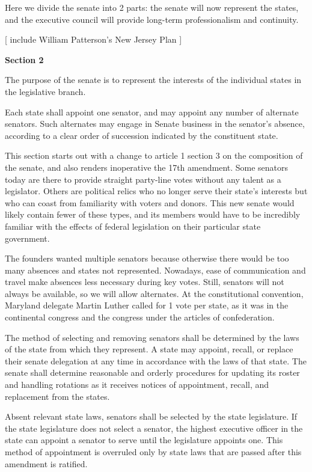 \documentclass{article}
\begin{document}
Here we divide the senate into 2 parts: the senate will now represent the states, and the executive council will provide long-term professionalism and continuity.

[ include William Patterson's New Jersey Plan ]

\begin{quoting}
\textbf{Section 2}

The purpose of the senate is to represent the interests of the individual states in the legislative branch.

Each state shall appoint one senator, and may appoint any number of alternate senators. Such alternates may engage in Senate business in the senator’s absence, according to a clear order of succession indicated by the constituent state.
\end{quoting}

This section starts out with a change to article 1 section 3 on the composition of the senate, and also renders inoperative the 17th amendment. Some senators today are there to provide straight party-line votes without any talent as a legislator. Others are political relics who no longer serve their state’s interests but who can coast from familiarity with voters and donors. This new senate would likely contain fewer of these types, and its members would have to be incredibly familiar with the effects of federal legislation on their particular state government.


The founders wanted multiple senators because otherwise there would be too many absences and states not represented. Nowadays, ease of communication and travel make absences less necessary during key votes. Still, senators will not always be available, so we will allow alternates. At the constitutional convention, Maryland delegate Martin Luther called for 1 vote per state, as it was in the continental congress and the congress under the articles of confederation.

\begin{quoting}
The method of selecting and removing senators shall be determined by the laws of the state from which they represent. A state may appoint, recall, or replace their senate delegation at any time in accordance with the laws of that state. The senate shall determine reasonable and orderly procedures for updating its roster and handling rotations as it receives notices of appointment, recall, and replacement from the states.

Absent relevant state laws, senators shall be selected by the state legislature. If the state legislature does not select a senator, the highest executive officer in the state can appoint a senator to serve until the legislature appoints one. This method of appointment is overruled only by state laws that are passed after this amendment is ratified.
\end{quoting}
\end{document}
